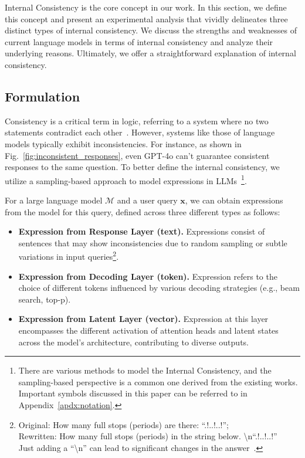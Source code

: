 \documentclass[lettersize,journal]{IEEEtran}
\begin{document}
\noindent Internal Consistency is the core concept in our work. In this section, we define this concept and present an experimental analysis that vividly delineates three distinct types of internal consistency. We discuss the strengths and weaknesses of current language models in terms of internal consistency and analyze their underlying reasons. Ultimately, we offer a straightforward explanation of internal consistency.


\subsection{Formulation} \label{sec:consistency_formulation}


\noindent Consistency is a critical term in logic, referring to a system where no two statements contradict each other~\cite{Tarski_1941}. However, systems like those of language models typically exhibit inconsistencies. For instance, as shown in Fig.~\ref{fig:inconsistent_responses}, even GPT-4o can't guarantee consistent responses to the same question. To better define the internal consistency, we utilize a sampling-based approach to model expressions in LLMs~\cite{SurveyUncertainty_23_arXiv_Nankai}\footnote{There are various methods to model the Internal Consistency, and the sampling-based perspective is a common one derived from the existing works. Important symbols discussed in this paper can be referred to in Appendix~\ref{apdx:notation}.}.

For a large language model $\mathcal{M}$ and a user query $\boldsymbol{x}$, we can obtain expressions from the model for this query, defined across three different types as follows:

\begin{itemize}
    \item \textbf{Expression from Response Layer (text).} Expressions consist of sentences that may show inconsistencies due to random sampling or subtle variations in input queries\footnote{Original: How many full stops (periods) are there: ``.!..!..!''; \\ Rewritten: How many full stops (periods) in the string below. \textbackslash n``.!..!..!'' \\ Just adding a ``\textbackslash n'' can lead to significant changes in the answer~\cite{sun2024evaluating}.}.
    \item \textbf{Expression from Decoding Layer (token).} Expression refers to the choice of different tokens influenced by various decoding strategies (e.g., beam search, top-p).
    \item \textbf{Expression from Latent Layer (vector).} Expression at this layer encompasses the different activation of attention heads and latent states across the model's architecture, contributing to diverse outputs. 
\end{itemize}
\end{document}
